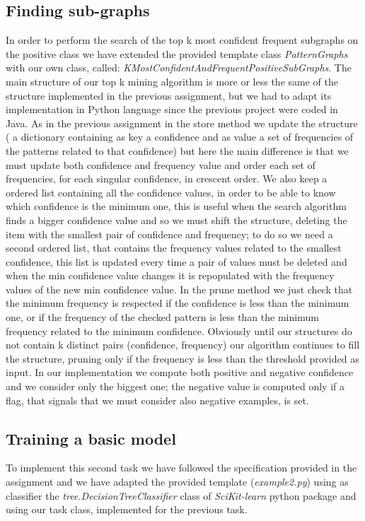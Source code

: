 \documentclass[11pt, a4paper]{article}
\begin{document}
		\subsection{Finding sub-graphs}
			In order to perform the search of the top k most confident frequent subgraphs on the positive class we have extended the provided template class \textit{PatternGraphs} with our own class, called: \newline \textit{K\textunderscore MostConfidentAndFrequentPositiveSubGraphs}.\newline
			The main structure of our top k mining algorithm is more or less the same of the structure implemented in the previous assignment, but we had to adapt its implementation in Python language since the previous project were coded in Java.
			As in the previous assignment in the store method we update the structure ( a dictionary containing as key a confidence and as value a set of frequencies of the patterns related to that confidence) but here the main difference is that we must update both confidence and frequency value and order each set of frequencies, for each singular confidence, in crescent order. We also keep a ordered list containing all the confidence values, in order to be able to know which confidence is the minimum one, this is useful when the search algorithm finds a bigger confidence value and so we must shift the structure, deleting the item with the smallest pair of confidence and frequency; to do so we need a second ordered list, that contains the frequency values related to the smallest confidence, this list is updated every time a pair of values must be deleted and when the min confidence value changes it is repopulated with the frequency values of the new min confidence value.\newline
			In the prune method we just check that the minimum frequency is respected if the confidence is less than the minimum one, or if the frequency of the checked pattern is less than the minimum frequency related to the minimum confidence.
			Obviously until our structures do not contain k distinct pairs (confidence, frequency) our algorithm continues to fill the structure, pruning only if the frequency is less than the threshold provided as input.
			In our implementation we compute both positive and negative confidence and we consider only the biggest one; the negative value is computed only if a flag, that signals that we must consider also negative examples, is set.

		\subsection{Training a basic model}
			To implement this second task we have followed the specification provided in the assignment and we have adapted the provided template (\textit{example2.py}) using as classifier the \textit{tree.DecisionTreeClassifier} class of \textit{SciKit-learn} python package and using our task class, implemented for the previous task.
\end{document}

